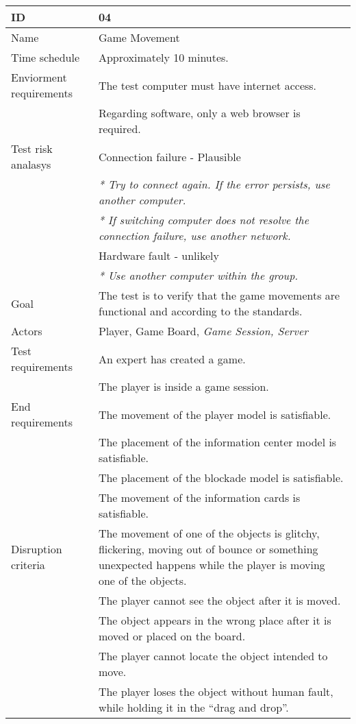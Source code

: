 {\footnotesize
\begin{table}[H]
\begin{tabular}{| p{5cm} | p{10cm} |}\hline
	\textbf{ID}	& \textbf{04}\\ \hline
	Name		& Game Movement\\ \hline
	Time schedule	& Approximately 10 minutes.\\ \hline
	Enviorment requirements 
		& The test computer must have internet access. \\
		& Regarding software, only a web browser is required. \\ \hline
	Test risk analasys 
		& Connection failure - Plausible \\ 
		& \emph{* Try to connect again. If the error persists, use another computer.}\\
		& \emph{* If switching computer does not resolve the connection failure, use another network.}\\ 
		& Hardware fault - unlikely \\
		& \emph{* Use another computer within the group.} \\ \hline
	Goal	& The test is to verify that the game movements are functional and according to the standards.\\ \hline
	Actors	& Player, Game Board, \emph{Game Session, Server}\\ \hline
	Test requirements
		& An expert has created a game. \\
		& The player is inside a game session. \\ \hline
	End requirements 
		& The movement of the player model is satisfiable.\\
		& The placement of the information center model is satisfiable.\\
		& The placement of the blockade model is satisfiable.\\
		& The movement of the information cards is satisfiable. \\ \hline
	Disruption criteria 
		& The movement of one of the objects is glitchy, flickering, moving out of bounce 
			or something unexpected happens while the player is moving one of the objects. \\
		& The player cannot see the object after it is moved. \\
		& The object appears in the wrong place after it is moved or placed on the board. \\
		& The player cannot locate the object intended to move. \\
		& The player loses the object without human fault, while holding it in the “drag and drop”. \\

\end{tabular}
\end{table}}
